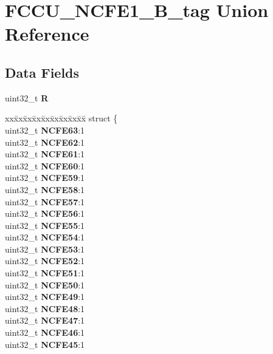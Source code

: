 \hypertarget{unionFCCU__NCFE1__32B__tag}{}\section{F\+C\+C\+U\+\_\+\+N\+C\+F\+E1\+\_\+B\+\_\+tag Union Reference}
\label{unionFCCU__NCFE1__32B__tag}
\subsection*{Data Fields}
\begin{DoxyCompactItemize}
\item 
\mbox{\label{unionFCCU__NCFE1__32B__tag_a9b9fc09293edc1d82ccad921b3318db5}} 
uint32\+\_\+t {\bfseries R}
\item 
\mbox{\label{unionFCCU__NCFE1__32B__tag_ab782ac5f6aa4d3eb8dc9c912c1ee9ac3}} 
\begin{tabbing}
xx\=xx\=xx\=xx\=xx\=xx\=xx\=xx\=xx\=\kill
struct \{\\
\>uint32\_t {\bfseries NCFE63}:1\\
\>uint32\_t {\bfseries NCFE62}:1\\
\>uint32\_t {\bfseries NCFE61}:1\\
\>uint32\_t {\bfseries NCFE60}:1\\
\>uint32\_t {\bfseries NCFE59}:1\\
\>uint32\_t {\bfseries NCFE58}:1\\
\>uint32\_t {\bfseries NCFE57}:1\\
\>uint32\_t {\bfseries NCFE56}:1\\
\>uint32\_t {\bfseries NCFE55}:1\\
\>uint32\_t {\bfseries NCFE54}:1\\
\>uint32\_t {\bfseries NCFE53}:1\\
\>uint32\_t {\bfseries NCFE52}:1\\
\>uint32\_t {\bfseries NCFE51}:1\\
\>uint32\_t {\bfseries NCFE50}:1\\
\>uint32\_t {\bfseries NCFE49}:1\\
\>uint32\_t {\bfseries NCFE48}:1\\
\>uint32\_t {\bfseries NCFE47}:1\\
\>uint32\_t {\bfseries NCFE46}:1\\
\>uint32\_t {\bfseries NCFE45}:1\\

\end{tabbing}
\end{DoxyCompactItemize}
